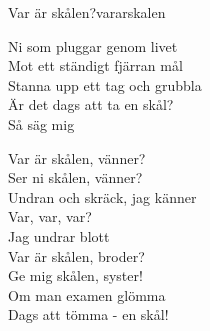 \begin{song}{Var är skålen?}{vararskalen}
\begin{vers}
Ni som pluggar genom livet\\
Mot ett ständigt fjärran mål\\
Stanna upp ett tag och grubbla\\
Är det dags att ta en skål?\\
Så säg mig\\
\end{vers}
\begin{vers}
Var är skålen, vänner?\\
Ser ni skålen, vänner?\\
Undran och skräck, jag känner\\
Var, var, var?\\
Jag undrar blott\\
Var är skålen, broder?\\
Ge mig skålen, syster!\\
Om man examen glömma\\
Dags att tömma - en skål!\\
\end{vers}
\end{song}
%
%
%
%

